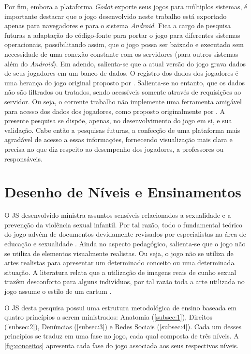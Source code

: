 Por fim, embora a plataforma \textit{Godot} exporte seus jogos para múltiplos sistemas, é importante destacar que o jogo desenvolvido neste trabalho está exportado apenas para navegadores e para o sistema \textit{Android}. Fica a cargo de pesquisa futuras a adaptação do código-fonte para portar o jogo para diferentes sistemas operacionais, possibilitando assim, que o jogo possa ser baixado e executado sem necessidade de uma conexão constante com os servidores (para outros sistemas além do \textit{Android}). Em adendo, salienta-se que a atual versão do jogo grava dados de seus jogadores em um banco de dados. O registro dos dados dos jogadores é uma herança do jogo original proposto por . Salienta-se no entanto, que os dados não são filtrados ou tratados, sendo acessíveis somente através de requisições ao servidor. Ou seja, o corrente trabalho não implemente uma ferramenta amigável para acesso dos dados dos jogadores, como proposto originalmente por . A presente pesquisa se dispõe, apenas, no desenvolvimento do jogo em si, e sua validação. Cabe então a pesquisas futuras, a confecção de uma plataforma mais agradável de acesso a essas informações, fornecendo visualização mais clara e precisa no que diz respeito ao desempenho dos jogadores, a professores ou responsáveis.  



\section{Desenho de Níveis e Ensinamentos}\label{sec:DN}

O \acf{JS} desenvolvido ministra assuntos sensíveis relacionados a sexualidade e a prevenção da violência sexual infantil. Por tal razão, todo o fundamental teórico do jogo advém de documentos devidamente revisados por especialistas na área de educação e sexualidade \cite{unesco2018international}. Ainda no aspecto pedagógico, salienta-se que o jogo não se utiliza de elementos visualmente realistas. Ou seja, o jogo não se utiliza de artes realistas para apresentar um determinado conceito ou uma determinada situação. A literatura relata que a utilização de imagens reais de cunho sexual trazêm desconforto para alguns indivíduos, por tal razão toda a arte utilizada no jogo assume o estilo de um cartum \cite{albert2020desenvolvimento}.

O \ac{JS} desta pesquisa possui uma estrutura metodológica de ensino baseada em quatro princípios a serem ministrados: Anatomia (\autoref{subsec:1}), Direitos (\autoref{subsec:2}), Denúncias (\autoref{subsec:3}) e Redes Sociais (\autoref{subsec:4}). Cada um desses princípios se traduz em uma fase no jogo, cada qual composta de três níveis. A \autoref{fig:conceitos} apresenta cada fase do jogo associada aos seus respectivos níveis.

